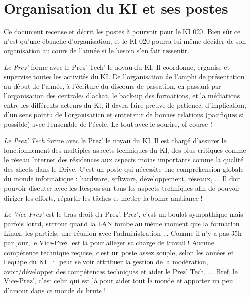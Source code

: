 \documentclass{ki019}
\begin{document}
\section{Organisation du KI et ses postes}


Ce document recense et décrit les postes à pourvoir pour le KI 020. Bien sûr ce n’est qu’une ébauche d’organisation, et le KI 020 pourra lui même décider de son organisation au cours de l’année si le besoin s’en fait ressentir.



\emph{Le Prez’} forme avec le Prez’ Tech’ le noyau du KI. Il coordonne, organise et supervise toutes les activités du KI. De l’organisation de l’amphi de présentation au début de l’année, à l’écriture du discours de passation, en passant par l’organisation des centrales d’achat, le back-up des formations, et la médiations entre les différents acteurs du KI, il devra faire preuve de patience, d’implication, d’un sens pointu de l’organisation et entretenir de bonnes relations (pacifiques si possible) avec l’ensemble de l’école. Le tout avec le sourire, of course !


\emph{Le Prez’ Tech} forme avec le Prez’ le noyau du KI. Il est chargé d’assurer le fonctionnement des multiples aspects techniques du KI, des plus critiques comme le réseau Internet des résidences aux aspects moins importants comme la qualité des sheets dans le Drive. C’est un poste qui nécessite une compréhension globale du monde informatique : hardware, software, développement, réseaux, ... Il doit pouvoir discuter avec les Respos sur tous les aspects techniques afin de pouvoir diriger les efforts, répartir les tâches et mettre la bonne ambiance !


\emph{Le Vice Prez’} est le bras droit du Prez’. Prez’, c’est un boulot sympathique mais parfois lourd, surtout quand la LAN tombe au même moment que la formation Linux, les partiels, une réunion avec l’administration ... Comme il n’y a pas 35h par jour, le Vice-Prez’ est là pour alléger sa charge de travail ! Aucune compétence technique requise, c’est un poste assez souple, selon les années et l’équipe du KI : il peut se voir attribuer la gestion de la modération, avoir/développer des compétences techniques et aider le Prez’ Tech, ... Bref, le Vice-Prez’, c’est celui qui est là pour aider tout le monde et apporter un peu d’amour dans ce monde de brute !
\end{document}
